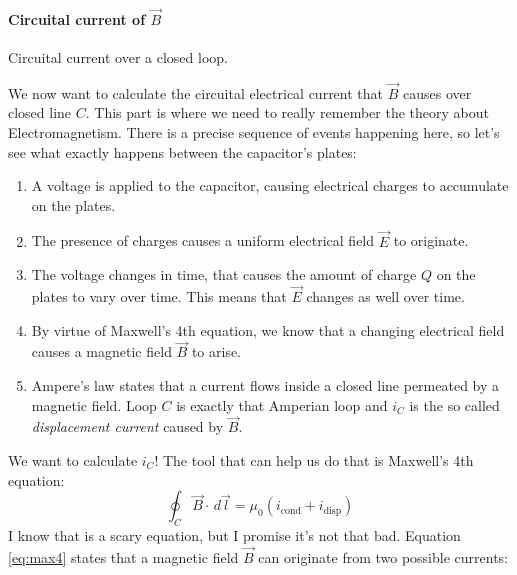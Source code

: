 \paragraph[Subproblem 4]{Circuital current of $\vec{B}$}
\label{par:subp4}
%
\begin{marginfigure}
    \centering
    
    \caption[Circuital current over a closed loop.]{Circuital current over a closed loop.}
    \label{fig:circuital}
\end{marginfigure}
%
We now want to calculate the circuital electrical current that $\vec{B}$ causes
over closed line $C$. This part is where we need to really remember the theory about
Electromagnetism. There is a precise sequence of events happening here, so let's
see what exactly happens between the capacitor's plates:
\begin{enumerate}
    \item A voltage is applied to the capacitor, causing electrical charges to accumulate on the
        plates.
    \item The presence of charges causes a uniform electrical field $\vec{E}$ to
        originate.
    \item The voltage changes in time, that causes the amount of charge $Q$ on the plates to
        vary over time. This means that $\vec{E}$ changes as well over time.
    \item By virtue of Maxwell's 4th equation, we know that a changing electrical field
        causes a magnetic field $\vec{B}$ to arise.
    \item Ampere's law states that a current flows inside a closed
        line permeated by a magnetic field.
        Loop $C$ is exactly that Amperian loop and $i_C$ is the so called
        \textit{displacement current} caused by $\vec{B}$.
\end{enumerate}
We want to
calculate $i_C$!
The tool that can help us do that is Maxwell's 4th equation:
\begin{equation}
\label{eq:max4}
    \oint_C \vec{B} \cdot \,d \vec{l} = \mu_0 (i_{\text{cond}} + i_{\text{disp}})
\end{equation}
I know that is a scary equation, but I promise it's not that bad.
Equation \ref{eq:max4} states that
a magnetic field $\vec{B}$ can originate from two possible currents:
